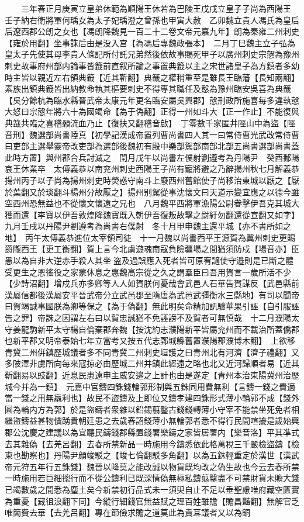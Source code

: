 　　三年春正月庚寅立皇弟休範為順陽王休若為巴陵王戊戌立皇子子尚為西陽王　壬子納右衛將軍何瑀女為太子妃瑀澄之曾孫也甲寅大赦　乙卯魏立貴人馮氏為皇后后遼西郡公朗之女也【馮朗降魏見一百二十二卷文帝元嘉九年】朗為秦雍二州刺史【雍於用翻】坐事誅后由是没入宫【為馮后專魏政張本】　二月丁巳魏主立子弘為皇太子先使其母李貴人條記所付託兄弟然後依故事賜死甲子以廣州刺史宗慤為豫州刺史故事府州部内論事皆籖前直叙所論之事置典籖以主之宋世諸皇子為方鎮者多幼時主皆以親近左右領典籖【近其靳翻】典籖之權稍重至是雖長王臨藩【長知兩翻】素族出鎮典籖皆出納教命執其樞要刺史不得專其職任及慤為豫州臨安吳喜為典籖【吳分餘杭為臨水縣晉武帝太康元年更名臨安屬吳興郡】慤刑政所施喜每多違執慤大怒曰宗慤年將六十為國竭命【為于偽翻】正得一州如斗大【正一作止】不能復與典籖共臨之喜稽顙流血乃止【復扶又翻稽音啟】　丁零數千家匿井陘山中為盜【陘音刑】魏選部尚書陸真【初學記漢成帝置列曹尚書四人其一曰常侍曹光武改常侍曹曰吏部主選舉靈帝改吏部為選部後魏初有殿中樂部駕部南部北部五尚書選部尚書蓋此時方置】與州郡合兵討滅之　閏月戊午以尚書左僕射劉遵考為丹陽尹　癸酉鄱陽哀王休業卒　太傅義恭以南兖州刺史西陽王子尚有寵將避之乃辭揚州秋七月解義恭揚州丙子以子尚為揚州刺史時熒惑守南斗上廢西州舊館使子尚移治東城以厭之【厭於葉翻又於琰翻斗楊州分故厭之】揚州别駕從事沈懷文曰天道示變宜應之以德今雖空西州恐無益也不從懷文懷遠之兄也　八月魏平西將軍漁陽公尉眷擊伊吾克其城大獲而還【李寶以伊吾敦煌降魏寶既入朝伊吾復叛故擊之尉紆勿翻還從宣翻又如字】　九月壬戌以丹陽尹劉遵考為尚書右僕射　冬十月甲申魏主還平城【亦不書所如之地】　丙午太傅義恭進位太宰領司徒　十一月魏以尚書西平王源賀為冀州刺史更賜爵隴西王【更工衡翻】賀上言今北虜遊魂南寇負險疆場之間猶須防戍【場音亦】臣愚以為自非大逆赤手殺人其坐盗及過誤應入死者皆可原宥讁使守邉則是已斷之體受更生之恩徭役之家蒙休息之惠魏高宗從之久之謂羣臣曰吾用賀言一歲所活不少【少詩沼翻】增戍兵亦多卿等人人如賀朕何憂哉會武邑人石華告賀謀反【武邑縣前漢屬信都後漢屬安平晉武帝分立武邑郡至隋唐為武邑武彊衡水三縣地】有司以聞帝曰賀竭誠事國朕為卿等保之【為于偽翻】無此明矣命精加訊驗華果引誣【自引服誣告之罪】帝誅之因謂左右曰以賀忠誠猶不免誣謗不及賀者可無慎哉　十二月濮陽太守姜龍駒新平太守楊自倫棄郡奔魏【按沈約志濮陽新平皆屬兖州而不載治所蓋僑郡也新平郡又明帝泰始七年立當考又按五代志鄄城縣舊置濮陽郡濮博木翻】　上欲移青冀二州倂鎮歷城議者多不同青冀二州刺史垣護之曰青州北有河濟【濟子禮翻】又多陂澤非虜所向每來寇掠必由歷城二州并鎮此經遠之略也北又近河歸順者易【近其靳翻易以豉翻】近息民患遠申主威安邉之上計也由是遂定【青州本治東陽冀州治歷城今并為一鎮】　元嘉中官鑄四銖錢輪郭形制與五銖同用費無利【言鑄一錢之費適當一錢之用無羸利也】故民不盜鑄及上即位又鑄孝建四銖形式薄小輪郭不成【錢外圓為輪内方為郭】於是盜鑄者衆雜以鉛錫翦鑿古錢錢轉薄小守宰不能禁坐死免者相繼盜鑄益甚物價踴貴朝廷患之去歲春詔錢薄小無輪郭者悉不得行民間喧擾是歲始興郡公沈慶之建議以為宜聽民鑄錢郡縣置錢署樂鑄之家皆居署内【樂音洛】平其凖式去其雜偽【去羌呂翻】去春所禁新品一時施用今鑄悉依此格萬稅三千嚴檢盜鑄【檢柬也勘察也】丹陽尹顔竣駁之【竣七倫翻駁多角翻】以為五銖輕重定於漢世【漢武帝元狩五年行五銖錢】魏晉以降莫之能改誠以物貨既均改之偽生故也今云去春所禁一時施用若巨細摠行而不從公鑄利已既深情偽無極私鑄翦鑿盡不可禁財貨未贍大錢已竭數歲之間悉為塵土矣今新禁初行品式未一須臾自止不足以垂聖慮唯府藏空匱實為重憂【藏徂浪翻下同】今縱行細錢官無益賦之理百姓雖贍【贍昌豔翻】無解官乏唯簡費去華【去羌呂翻】專在節儉求贍之道莫此為貴耳議者又以為銅